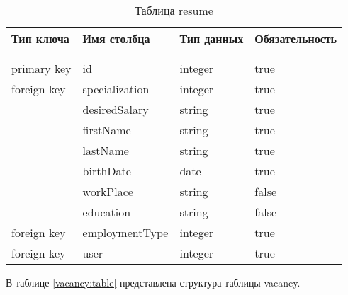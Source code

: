 \begin{xltabular}{\textwidth}{|l|l|p{1.7cm}|X|}
	\caption{Таблица resume \label{ssevsws:table}}\\ \hline
	\centrow Тип ключа & \centrow Имя столбца & \centrow Тип
	данных & \centrow Обязательность \\ \hline
	 &  &  &  \\ \hline
	\endfirsthead
	 &  &  &  \\ \hline
	\finishhead
	primary key & id & integer & true \\ \hline 
	foreign key & specialization & integer & true \\ \hline 
	 & desiredSalary & string & true \\ \hline 
	 & firstName & string & true \\ \hline 
	 & lastName & string & true \\ \hline 
	 & birthDate & date & true \\ \hline 
	 & workPlace & string & false \\ \hline
	 & education & string & false \\ \hline
	foreign key & employmentType & integer & true \\ \hline
	foreign key & user & integer & true \\ \hline
\end{xltabular}

В таблице \ref{vacancy:table} представлена структура таблицы vacancy.

